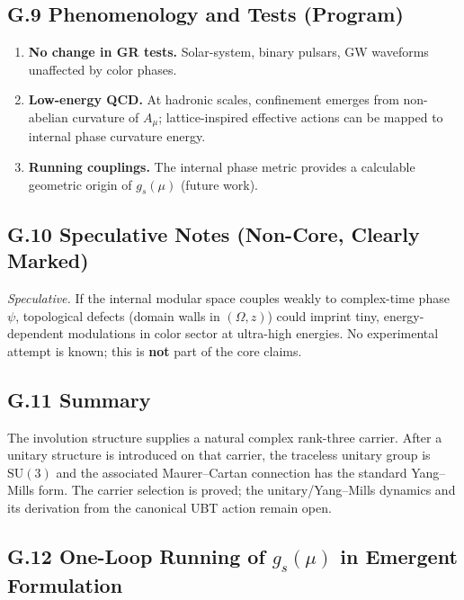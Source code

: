 \subsection*{G.9 Phenomenology and Tests (Program)}
\begin{enumerate}
\item \textbf{No change in GR tests.} Solar-system, binary pulsars, GW waveforms unaffected by color phases.
\item \textbf{Low-energy QCD.} At hadronic scales, confinement emerges from non-abelian curvature of $A_\mu$; lattice-inspired effective actions can be mapped to internal phase curvature energy.
\item \textbf{Running couplings.} The internal phase metric provides a calculable geometric origin of $g_s(\mu)$ (future work).
\end{enumerate}

\subsection*{G.10 Speculative Notes (Non-Core, Clearly Marked)}
\emph{Speculative.} If the internal modular space couples weakly to complex-time phase $\psi$, topological defects (domain walls in $(\Omega,z)$) could imprint tiny, energy-dependent modulations in color sector at ultra-high energies. No experimental attempt is known; this is \textbf{not} part of the core claims.

\subsection*{G.11 Summary}
The involution structure supplies a natural complex rank-three carrier.  After a unitary structure is introduced on that carrier, the traceless unitary group is $\mathrm{SU}(3)$ and the associated Maurer--Cartan connection has the standard Yang--Mills form.  The carrier selection is proved; the unitary/Yang--Mills dynamics and its derivation from the canonical UBT action remain open.

\subsection*{G.12 One-Loop Running of \texorpdfstring{$g_s(\mu)$}{g\_s(mu)} in Emergent Formulation}
\label{sec:G12_running}


